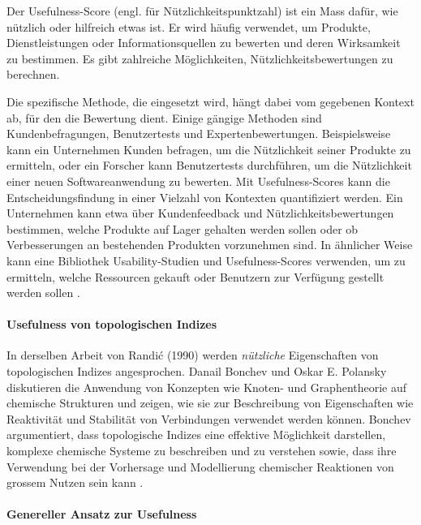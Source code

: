 Der Usefulness-Score (engl. für Nützlichkeitspunktzahl) ist ein Mass dafür, wie nützlich oder hilfreich etwas ist.
Er wird häufig verwendet, um Produkte, Dienstleistungen oder Informationsquellen zu bewerten und deren Wirksamkeit zu bestimmen.
Es gibt zahlreiche Möglichkeiten, Nützlichkeitsbewertungen zu berechnen.

Die spezifische Methode, die eingesetzt wird, hängt dabei vom gegebenen Kontext ab, für den die Bewertung dient.
Einige gängige Methoden sind Kundenbefragungen, Benutzertests und Expertenbewertungen.
Beispielsweise kann ein Unternehmen Kunden befragen, um die Nützlichkeit seiner Produkte zu ermitteln, oder ein Forscher kann Benutzertests durchführen, um die Nützlichkeit einer neuen Softwareanwendung zu bewerten.
Mit Usefulness-Scores kann die Entscheidungsfindung in einer Vielzahl von Kontexten quantifiziert werden.
Ein Unternehmen kann etwa über Kundenfeedback und Nützlichkeitsbewertungen bestimmen, welche Produkte auf Lager gehalten werden sollen oder ob Verbesserungen an bestehenden Produkten vorzunehmen sind. 
In ähnlicher Weise kann eine Bibliothek Usability-Studien und Usefulness-Scores verwenden, um zu ermitteln, welche Ressourcen gekauft oder Benutzern zur Verfügung gestellt werden sollen \cite{fiszman_automatic_2009}.

\paragraph{Usefulness von topologischen Indizes}

In derselben Arbeit von Randić (1990) \cite{randic_croatica_nodate} werden \textit{nützliche} Eigenschaften von topologischen Indizes angesprochen.
Danail Bonchev und Oskar E. Polansky diskutieren die Anwendung von Konzepten wie Knoten- und Graphentheorie auf chemische Strukturen und zeigen, wie sie zur Beschreibung von Eigenschaften wie Reaktivität und Stabilität von Verbindungen verwendet werden können. 
Bonchev argumentiert, dass topologische Indizes eine effektive Möglichkeit darstellen, komplexe chemische Systeme zu beschreiben und zu verstehen sowie, dass ihre Verwendung bei der Vorhersage und Modellierung chemischer Reaktionen von grossem Nutzen sein kann \cite{bonchev_topological_1987}.

\paragraph{Genereller Ansatz zur Usefulness}

